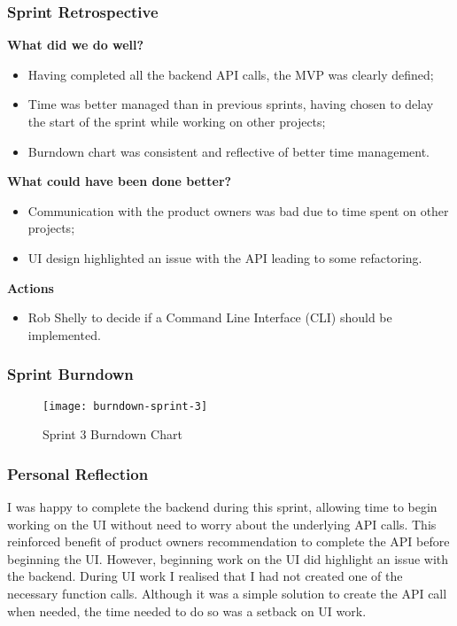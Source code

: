   \subsubsection{Sprint Retrospective}
  \textbf{What did we do well?}
  \begin{itemize}
   \item Having completed all the backend API calls, the MVP was clearly defined;
   \item Time was better managed than in previous sprints, having chosen to delay the start of the sprint while working on other projects;
   \item Burndown chart was consistent and reflective of better time management.
  \end{itemize}
   
   \noindent\textbf{What could have been done better?}
   \begin{itemize}
     \item Communication with the product owners was bad due to time spent on other projects;
     \item UI design highlighted an issue with the API leading to some refactoring.
   \end{itemize}
   
   \noindent\textbf{Actions}
   \begin{itemize}
     \item Rob Shelly to decide if a Command Line Interface (CLI) should be implemented.
   \end{itemize}
   
   \subsubsection{Sprint Burndown}
   
   \begin{figure}[H]
     \setlength{\belowcaptionskip}{15pt plus 3pt minus 2pt}
     \caption{Sprint 3 Burndown Chart}
     \centering
     \texttt{[image: burndown-sprint-3]}
     \label{fig:burndown-sprint-3}
   \end{figure}
   
   \subsubsection{Personal Reflection}
   I was happy to complete the backend during this sprint, allowing time to begin working on the UI without need to worry about the underlying API calls. This reinforced benefit of product owners recommendation to complete the API before beginning the UI. However, beginning work on the UI did highlight an issue with the backend. During UI work I realised that I had not created one of the necessary function calls. Although it was a simple solution to create the API call when needed, the time needed to do so was a setback on UI work.
   
